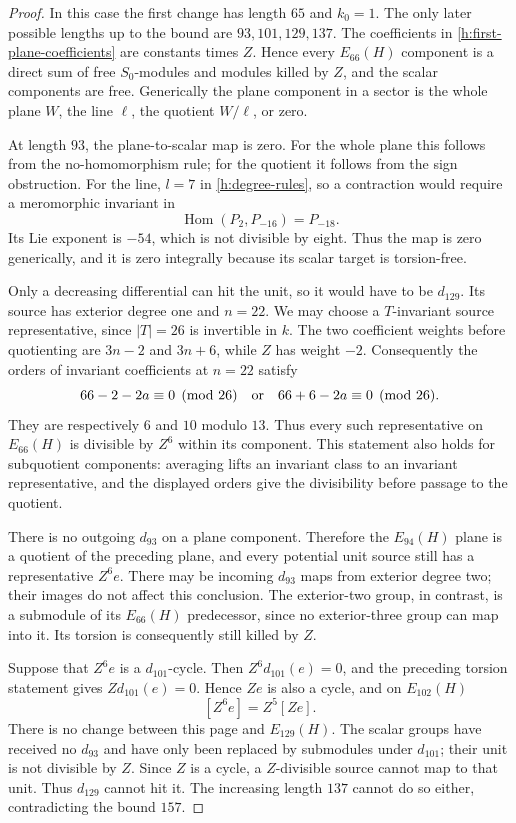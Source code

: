 \documentclass[11pt]{article}
\theoremstyle{definition}
\theoremstyle{remark}
\numberwithin{equation}{section}
\begin{document}
\begin{proof}
In this case the first change has length $65$ and $k_0=1$. The only
later possible lengths up to the bound are $93,101,129,137$.
The coefficients in \eqref{h:first-plane-coefficients} are constants
times $Z$. Hence every $E_{66}(H)$ component is a direct sum of free
$S_0$-modules and modules killed by $Z$, and the scalar components
are free. Generically the plane component in a sector is the whole
plane $W$, the line $\ell$, the quotient $W/\ell$, or zero.

At length $93$, the plane-to-scalar map is zero. For the whole plane
this follows from the no-homomorphism rule; for the quotient it
follows from the sign obstruction. For the line, $l=7$ in
\eqref{h:degree-rules}, so a contraction would require a meromorphic
invariant in
\[
 \operatorname{Hom}(P_2,P_{-16})=P_{-18}.
\]
Its Lie exponent is $-54$, which is not divisible by eight. Thus the
map is zero generically, and it is zero integrally because its scalar
target is torsion-free.

Only a decreasing differential can hit the unit, so it would have to
be $d_{129}$. Its source has exterior degree one and $n=22$.
We may choose a $T$-invariant source representative, since $|T|=26$
is invertible in $k$. The two coefficient weights before quotienting
are $3n-2$ and $3n+6$, while $Z$ has weight $-2$. Consequently the
orders of invariant coefficients at $n=22$ satisfy
\[
 66-2-2a\equiv0\pmod{26}
 \quad\hbox{or}\quad
 66+6-2a\equiv0\pmod{26}.
\]
They are respectively $6$ and $10$ modulo $13$. Thus every such
representative on $E_{66}(H)$ is divisible by $Z^6$ within its
component. This statement also holds for subquotient components:
averaging lifts an invariant class to an invariant representative,
and the displayed orders give the divisibility before passage to
the quotient.

There is no outgoing $d_{93}$ on a plane component. Therefore the
$E_{94}(H)$ plane is a quotient of the preceding plane, and every
potential unit source still has a representative $Z^6e$. There may
be incoming $d_{93}$ maps from exterior degree two; their images do
not affect this conclusion. The exterior-two group, in contrast,
is a submodule of its $E_{66}(H)$ predecessor, since no exterior-three
group can map into it. Its torsion is consequently still killed by
$Z$.

Suppose that $Z^6e$ is a $d_{101}$-cycle. Then
$Z^6d_{101}(e)=0$, and the preceding torsion statement gives
$Zd_{101}(e)=0$. Hence $Ze$ is also a cycle, and on $E_{102}(H)$
\[
 [Z^6e]=Z^5[Ze].
\]
There is no change between this page and $E_{129}(H)$. The scalar
groups have received no $d_{93}$ and have only been replaced by
submodules under $d_{101}$; their unit is not divisible by $Z$.
Since $Z$ is a cycle, a $Z$-divisible source cannot map to that unit.
Thus $d_{129}$ cannot hit it. The increasing length $137$ cannot do
so either, contradicting the bound $157$.
\end{proof}
\end{document}
